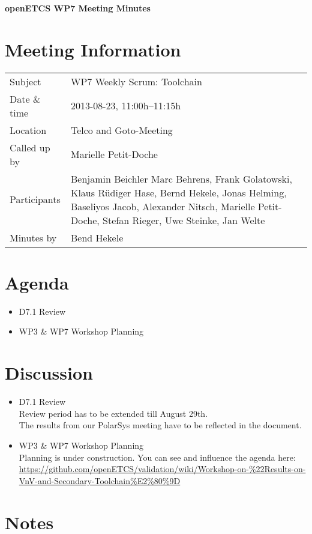 \documentclass[a4paper, 11pt]{article}
\begin{document}
{\begin{center}\huge\bf openETCS WP7 Meeting Minutes\end{center}}
\section{Meeting Information}

\renewcommand{\arraystretch}{1.5}
\begin{supertabular}{m{.2\textwidth}m{.8\textwidth}}
Subject & WP7 Weekly Scrum: Toolchain\\
Date \& time & 2013-08-23, 11:00h--11:15h\\
Location & Telco and Goto-Meeting\\
Called up by & Marielle Petit-Doche\\
Participants &
Benjamin Beichler
Marc Behrens,
Frank Golatowski,
Klaus R\"udiger Hase,
Bernd Hekele,
Jonas Helming,
Baseliyos Jacob,
Alexander Nitsch,
Marielle Petit-Doche,
Stefan Rieger,
Uwe Steinke,
Jan Welte\\


Minutes by & Bend Hekele\\

\end{supertabular}
\renewcommand{\arraystretch}{1.0}


\section{Agenda}
\begin{itemize}
\item D7.1 Review
\item WP3 \& WP7 Workshop Planning
\end{itemize}

\section{Discussion}

\begin{itemize}
\item D7.1 Review\\
Review period has to be extended till August 29th.\\
The results from our PolarSys meeting have to be reflected in the document.\\
\item WP3 \& WP7 Workshop Planning\\
Planning is under construction.
You can see and influence the agenda here:\\
\url{https://github.com/openETCS/validation/wiki/Workshop-on-%22Results-on-VnV-and-Secondary-Toolchain%E2%80%9D}
\end{itemize}

\section{Notes}
\end{document}
